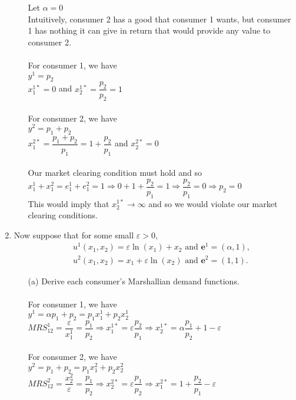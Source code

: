 \documentclass[11pt]{article}
\begin{document}
\begin{enumerate}
\begin{itemize}
	Let $\alpha=0$\\
	Intuitively, consumer 2 has a good that consumer 1 wants, but consumer 1 has nothing it can give in return that would provide any value to consumer 2.\\\\
	For consumer 1, we have\\
	$y^1=p_2$\\
	$x_1^{1*}=0$ and $x_2^{1*}=\dfrac{p_2}{p_2}=1$\\\\
	For consumer 2, we have\\
	$y^2=p_1+p_2$\\
	$x_1^{2*}=\dfrac{p_1+p_2}{p_1}=1+\dfrac{p_2}{p_1}$ and $x_2^{2*}=0$\\\\
	Our market clearing condition must hold and so\\
	$x_1^1+x_1^2=e_1^1+e_1^2=1\Rightarrow0+1+\dfrac{p_2}{p_1}=1\Rightarrow\dfrac{p_2}{p_1}=0\Rightarrow p_2=0$\\
	This would imply that $x_2^{1*}\rightarrow\infty$ and so we would violate our market clearing conditions.
	\end{itemize}
\pagebreak
\item Now suppose that for some small $\varepsilon>0$, \begin{eqnarray*}
	&&u^{1}(x_{1},x_{2})	=\varepsilon \ln(x_{1})+x_{2}\text{ and }\mathbf{e}^{1}=(\alpha,1),\\
	&&u^{2}(x_{1},x_{2})	=x_{1}+\varepsilon \ln(x_{2})\text{ and }\mathbf{e}^{2}=(1,1).
	\end{eqnarray*}
	\begin{itemize}
	\item[(a)] Derive each consumer's Marshallian demand functions.
	\smallskip\\\\
	For consumer 1, we have\\
	$y^1=\alpha p_1+p_2=p_1x_1^1+p_2x_2^1$\\
	$MRS_{12}^1=\dfrac{\varepsilon}{x_1^1}=\dfrac{p_1}{p_2}\Rightarrow x_1^{1*}=\varepsilon\dfrac{p_2}{p_1}\Rightarrow x_2^{1*}=\alpha\dfrac{p_1}{p_2}+1-\varepsilon$\\\\
	For consumer 2, we have\\
	$y^2=p_1+p_2=p_1x_1^2+p_2x_2^2$\\
	$MRS_{12}^2=\dfrac{x_2^2}{\varepsilon}=\dfrac{p_1}{p_2}\Rightarrow x_2^{2*}=\varepsilon\dfrac{p_1}{p_2}\Rightarrow x_1^{2*}=1+\dfrac{p_2}{p_1}-\varepsilon$\\\\

\end{itemize}
\end{enumerate}
\end{document}

